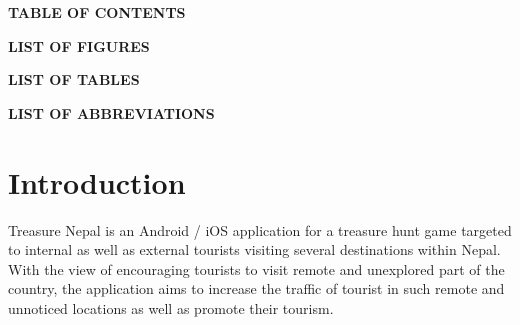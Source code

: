 \documentclass[12pt, a4paper, oneside]{article}
\begin{document}
\large
{}
\begin{center}
	\textbf{TABLE OF CONTENTS}
\end{center}
\normalsize
\setlength{\cftbeforetoctitleskip}{0pt}
\renewcommand{\contentsname}{}
\tableofcontents

\break










\large
{}
\begin{center}
	\textbf{LIST OF FIGURES}
\end{center}
\renewcommand{\listfigurename}{}
\listoffigures

\break










\large
{}
\begin{center}
	\textbf{LIST OF TABLES}
\end{center}
\renewcommand{\listtablename}{}
\listoftables

\break












\large
{}
\begin{center}
	\textbf{LIST OF ABBREVIATIONS}
\end{center}

\break

\cfoot{\textbf{\thepage} /  \pageref{LastPage}}
\normalsize
{}
\section{Introduction} 
Treasure Nepal is an Android / iOS application for a treasure hunt game targeted to internal as well as external tourists visiting several destinations within Nepal. With the view of encouraging tourists to visit remote and unexplored part of the country, the application aims to increase the traffic of tourist in such remote and unnoticed locations as well as promote their tourism. 
\end{document}
